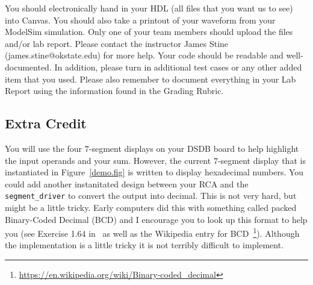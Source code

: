 \documentclass{article}
\begin{document}
You should electronically hand in your HDL (all files that you want
us to see) into Canvas.
You should also take a printout of your waveform 
from your ModelSim simulation.  
Only one of your team members should upload
the files and/or lab report. Please contact
the instructor James Stine (james.stine@okstate.edu) 
for more help.  Your code should be
readable and well-documented. In addition, please turn in additional
test cases or any other added item that you used. 
Please also remember to document everything in your Lab Report using
the information found in the Grading Rubric.

\subsection{Extra Credit}

You will use the four $7$-segment displays on your DSDB board to help
highlight the input operands and your sum.  However, the current
$7$-segment display that is instantiated in Figure~\ref{demo.fig} is
written to display hexadecimal numbers.  You could add another
instanitated design between your RCA and the \verb!segment_driver! to
convert the output into decimal.  This is not very hard, but might
be a little tricky.  Early computers did this with something called
packed Binary-Coded Decimal (BCD) and I encourage you to look up this
format to help you (see Exercise 1.64 in~\cite{ddca-riscv} as well as
the Wikipedia entry for
BCD~\footnote{\url{https://en.wikipedia.org/wiki/Binary-coded_decimal}}).
Although the implementation is a little tricky it
is not terribly difficult to implement.



\end{document}
